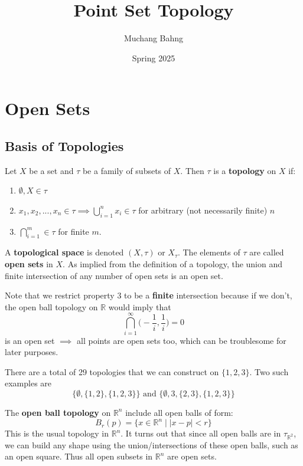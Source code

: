 \documentclass{article}
\begin{document}
\title{Point Set Topology}
\author{Muchang Bahng}
\date{Spring 2025}

\maketitle
\tableofcontents
\pagebreak

\section{Open Sets}

  \subsection{Basis of Topologies}

    \begin{definition}[Topology]
    Let $X$ be a set and $\tau$ be a family of subsets of $X$. Then $\tau$ is a \textbf{topology} on $X$ if: 
    \begin{enumerate}
      \item $\emptyset, X \in \tau$
      \item $x_1, x_2, ..., x_n \in \tau \implies \bigcup_{i = 1}^{n} x_{i} \in \tau$ for arbitrary (not necessarily finite) $n$
      \item $\bigcap_{i=1}^{m} \in \tau$ for finite $m$. 
    \end{enumerate}
    A \textbf{topological space} is denoted $(X, \tau)$ or $X_{\tau}$. The elements of $\tau$ are called \textbf{open sets} in $X$. As implied from the definition of a topology, the union and finite intersection of any number of open sets is an open set. 
    \end{definition}

    Note that we restrict property 3 to be a \textbf{finite} intersection because if we don't, the open ball topology on $\mathbb{R}$ would imply that 
    \[ \bigcap_{i = 1}^{\infty} \Big( - \frac{1}{i}, \frac{1}{i} \Big) = 0\]
    is an open set $\implies$ all points are open sets too, which can be troublesome for later purposes. 

    \begin{example}
    There are a total of 29 topologies that we can construct on $\{1, 2, 3\}$. Two such examples are 
    \[\{\emptyset, \{1, 2\}, \{1, 2, 3\}\} \text{ and } \{\emptyset, 3, \{2, 3\}, \{1, 2, 3\}\}\]
    \end{example}

    \begin{example}
    The \textbf{open ball topology} on $\mathbb{R}^{n}$ include all open balls of form: 
    \[ B_{r}(p) = \{ x \in \mathbb{R}^{n} \; | \; |x-p| < r \} \]
    This is the usual topology in $\mathbb{R}^{n}$. It turns out that since all open balls are in $\tau_{\mathbb{R}^{2}}$, we can build any shape using the union/intersections of these open balls, such as an open square. Thus all open subsets in $\mathbb{R}^{n}$ are open sets. 
    \end{example}
\end{document}
